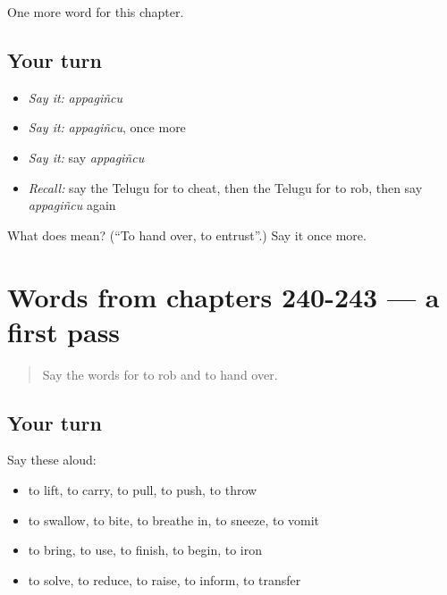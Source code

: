 \begin{grammarlens}[title={What you've built}]
One more word for this chapter.
\end{grammarlens}

\subsection*{Your turn}
\begin{itemize}
\raggedright
  \item \emph{Say it:} \emph{appagiñcu}
  \item \emph{Say it:} \emph{appagiñcu}, once more
  \item \emph{Say it:} say \emph{appagiñcu}
  \item \emph{Recall:} say the Telugu for to cheat, then the Telugu for to rob, then say \emph{appagiñcu} again
\end{itemize}

\begin{tcolorbox}[breakable,colback=teal!4,colframe=teal!35!black,title={Before you move on}]
What does  mean? (\textquotedblleft{}To hand over, to entrust\textquotedblright{}.) Say it once more.
\end{tcolorbox}
\section[(dialogue)]{Words from chapters 240-243 — a first pass}

\label{lesson:TE-R248-first-pass-words-from-chapters-240-243}



\begin{quote}
Say the words for to rob and to hand over.
\end{quote}

\subsection*{Your turn}
Say these aloud:

\begin{itemize}
\raggedright
  \item to lift, to carry, to pull, to push, to throw
  \item to swallow, to bite, to breathe in, to sneeze, to vomit
  \item to bring, to use, to finish, to begin, to iron
  \item to solve, to reduce, to raise, to inform, to transfer
\end{itemize}

